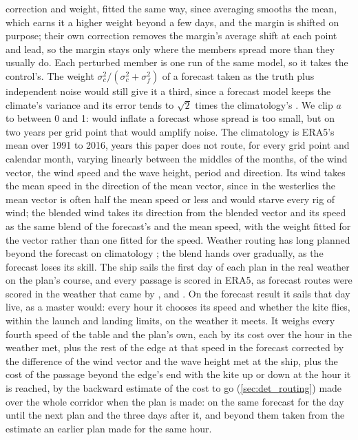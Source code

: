 correction and weight, fitted the same way, since averaging smooths the mean, which earns it a higher weight beyond a few days, and the margin is shifted on purpose; their own correction removes the margin's average shift at each point and lead, so the margin stays only where the members spread more than they usually do. Each perturbed member is one run of the same model, so it takes the control's.  The weight $\sigma_c^2/(\sigma_c^2 + \sigma_f^2)$ of a forecast taken as the truth plus independent noise would still give it a third, since a forecast model keeps the climate's variance and its error tends to $\sqrt{2}$ times the climatology's \citep{leith1974}. We clip $a$ to between 0 and 1: \citet{murphy1989} would inflate a forecast whose spread is too small, but on two years per grid point that would amplify noise. The climatology is ERA5's mean over 1991 to 2016, years this paper does not route, for every grid point and calendar month, varying linearly between the middles of the months, of the wind vector, the wind speed and the wave height, period and direction. Its wind takes the mean speed in the direction of the mean vector, since in the westerlies the mean vector is often half the mean speed or less and would starve every rig of wind; the blended wind takes its direction from the blended vector and its speed as the same blend of the forecast's and the mean speed, with the weight fitted for the vector rather than one fitted for the speed. Weather routing has long planned beyond the forecast on climatology \citep{bowditch2024}; the blend hands over gradually, as the forecast loses its skill. The ship sails the first day of each plan in the real weather on the plan's course, and every passage is scored in ERA5, as forecast routes were scored in the weather that came by \citet{hagiwara1989}, \citet{saetra2004} and \citet{mason2023}. On the forecast result it sails that day live, as a master would: every hour it chooses its speed and whether the kite flies, within the launch and landing limits, on the weather it meets. It weighs every fourth speed of the table and the plan's own, each by its cost over the hour in the weather met, plus the rest of the edge at that speed in the forecast corrected by the difference of the wind vector and the wave height met at the ship, plus the cost of the passage beyond the edge's end with the kite up or down at the hour it is reached, by the backward estimate of the cost to go (\cref{sec:det_routing}) made over the whole corridor when the plan is made: on the same forecast for the day until the next plan and the three days after it, and beyond them taken from the estimate an earlier plan made for the same hour.  